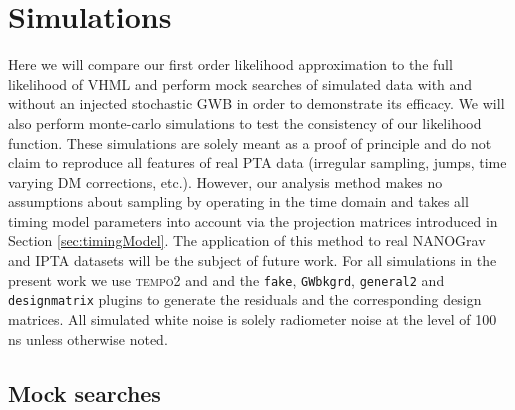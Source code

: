 \documentclass[iop]{emulateapj} \usepackage{apjfonts}
\begin{document}
\section{Simulations} \label{sec:simulations}

Here we will compare our first order likelihood approximation to the
full likelihood of VHML and perform mock searches of simulated data
with and without an injected stochastic GWB in order to demonstrate
its efficacy. We will also perform monte-carlo simulations to test the
consistency of our likelihood function. These simulations are solely
meant as a proof of principle and do not claim to reproduce all
features of real PTA data (irregular sampling, jumps, time varying DM
corrections, etc.). However, our analysis method makes no assumptions
about sampling by operating in the time domain and takes all timing
model parameters into account via the projection matrices introduced
in Section \ref{sec:timingModel}. The application of this method to
real NANOGrav and IPTA datasets will be the subject of future work.
For all simulations in the present work we use \textsc{tempo2} and and
the \texttt{fake}, \texttt{GWbkgrd}, \texttt{general2} and
\texttt{designmatrix} plugins to generate the residuals and the
corresponding design matrices. All simulated white noise is solely
radiometer noise at the level of 100 ns unless otherwise noted.

\subsection{Mock searches} \label{sec:mockSearch}
\end{document}
